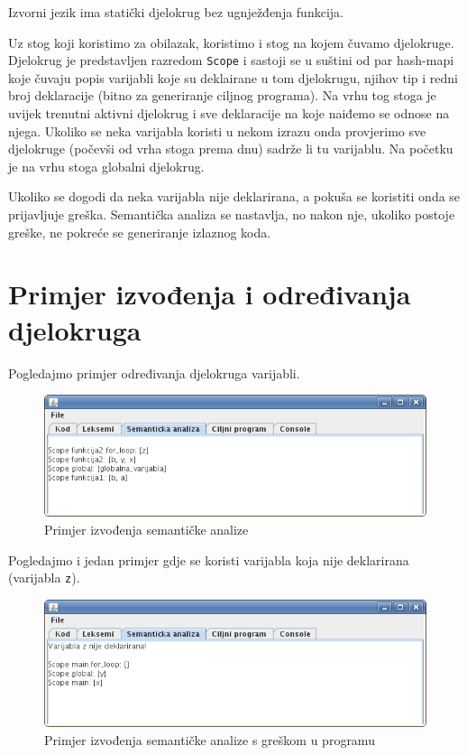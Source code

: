 Izvorni jezik ima statički djelokrug bez ugnježđenja funkcija. 

Uz stog koji koristimo za obilazak, koristimo i stog na kojem čuvamo djelokruge. Djelokrug
je predstavljen razredom \texttt{Scope} i sastoji se u suštini od par hash-mapi koje čuvaju
popis varijabli koje su deklairane u tom djelokrugu, njihov tip i redni broj deklaracije (bitno za generiranje ciljnog programa).
Na vrhu tog stoga je uvijek trenutni aktivni djelokrug i sve deklaracije na koje naiđemo se odnose na njega.
Ukoliko se neka varijabla koristi u nekom izrazu onda provjerimo sve djelokruge (počevši od vrha stoga prema dnu)
sadrže li tu varijablu. Na početku je na vrhu stoga globalni djelokrug.

Ukoliko se dogodi da neka varijabla nije deklarirana, a pokuša se koristiti onda se prijavljuje greška. Semantička
analiza se nastavlja, no nakon nje, ukoliko postoje greške, ne pokreće se generiranje izlaznog koda.

\section{Primjer izvođenja i određivanja djelokruga}
Pogledajmo primjer određivanja djelokruga varijabli.



\begin{figure}[H]
  \centering
    \includegraphics[width=13cm]{primjer-semanticka1}
  \caption{Primjer izvođenja semantičke analize}
\end{figure}

\pagebreak

Pogledajmo i jedan primjer gdje se koristi varijabla koja nije deklarirana (varijabla \texttt{z}).


\begin{figure}[H]
  \centering
    \includegraphics[width=13cm]{primjer-semanticka2}
  \caption{Primjer izvođenja semantičke analize s greškom u programu}
\label{komponente}
\end{figure}

